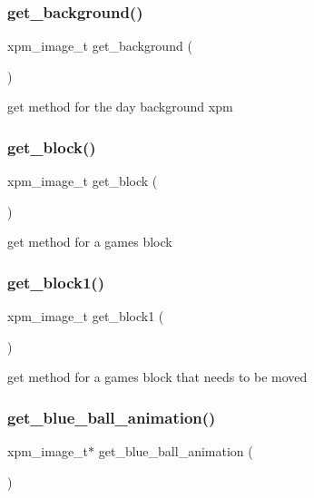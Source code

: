 \subsubsection{\texorpdfstring{get\+\_\+background()}{get\_background()}}
{\footnotesize\ttfamily xpm\+\_\+image\+\_\+t get\+\_\+background (\begin{DoxyParamCaption}{ }\end{DoxyParamCaption})}



get method for the day background xpm 

\mbox{\label{group__XPM_ga55abea20b97f7d2ba8c63a69ff86d18b}} 
\subsubsection{\texorpdfstring{get\+\_\+block()}{get\_block()}}
{\footnotesize\ttfamily xpm\+\_\+image\+\_\+t get\+\_\+block (\begin{DoxyParamCaption}{ }\end{DoxyParamCaption})}



get method for a game\textquotesingle{}s block 

\mbox{\label{group__XPM_gaa8e536961c0ed7f1bcd089ae9fb0c4c7}} 
\subsubsection{\texorpdfstring{get\+\_\+block1()}{get\_block1()}}
{\footnotesize\ttfamily xpm\+\_\+image\+\_\+t get\+\_\+block1 (\begin{DoxyParamCaption}{ }\end{DoxyParamCaption})}



get method for a game\textquotesingle{}s block that needs to be moved 

\mbox{\label{group__XPM_gaa3caf6e5d8c0178d8267a0d56408169f}} 
\subsubsection{\texorpdfstring{get\+\_\+blue\+\_\+ball\+\_\+animation()}{get\_blue\_ball\_animation()}}
{\footnotesize\ttfamily xpm\+\_\+image\+\_\+t$\ast$ get\+\_\+blue\+\_\+ball\+\_\+animation (\begin{DoxyParamCaption}{ }\end{DoxyParamCaption})}



